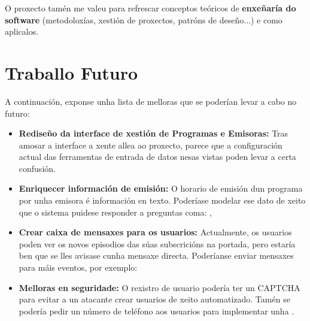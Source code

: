 O proxecto tamén me valeu para refrescar conceptos teóricos de \textbf{enxeñaría do software} (metodoloxías, xestión de proxectos, patróns de deseño...) e como aplicalos.


\section{Traballo Futuro}

A continuación, exponse unha lista de melloras que se poderían levar a cabo no futuro:

\begin{itemize}
	
	\item \textbf{Rediseño da interface de xestión de Programas e Emisoras:} Tras amosar a interface a xente allea ao proxecto, parece que a configuración actual das ferramentas de entrada de datos nesas vistas poden levar a certa confusión.
	
	\item \textbf{Enriquecer información de emisión:} O horario de emisión dun programa por unha emisora é información en texto. Poderíase modelar ese dato de xeito que o sistema puidese responder a preguntas coma: , 
	
	\item \textbf{Crear caixa de mensaxes para os usuarios:} Actualmente, os usuarios poden ver os novos episodios das súas subscricións na portada, pero estaría ben que se lles avisase cunha mensaxe directa. Poderíanse enviar mensaxes para máis eventos, por exemplo: 
	
	\item \textbf{Melloras en seguridade:} O rexistro de usuario podería ter un CAPTCHA para evitar a un atacante crear usuarios de xeito automatizado. Tamén se podería pedir un número de teléfono aos usuarios para implementar unha .
\end{itemize}